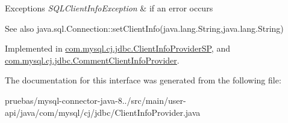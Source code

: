 \begin{DoxyExceptions}{Exceptions}
{\em S\+Q\+L\+Client\+Info\+Exception} & if an error occurs\\
\hline
\end{DoxyExceptions}
\begin{DoxySeeAlso}{See also}
java.\+sql.\+Connection\+::set\+Client\+Info(java.\+lang.\+String,java.\+lang.\+String) 
\end{DoxySeeAlso}


Implemented in \mbox{\hyperlink{classcom_1_1mysql_1_1cj_1_1jdbc_1_1_client_info_provider_s_p_a5f11c59093e5f448770a7f48fb17fcf2}{com.\+mysql.\+cj.\+jdbc.\+Client\+Info\+Provider\+SP}}, and \mbox{\hyperlink{classcom_1_1mysql_1_1cj_1_1jdbc_1_1_comment_client_info_provider_a76cfb73296a575e078acf7228e36b2dc}{com.\+mysql.\+cj.\+jdbc.\+Comment\+Client\+Info\+Provider}}.



The documentation for this interface was generated from the following file\+:\begin{DoxyCompactItemize}
\item 
pruebas/mysql-\/connector-\/java-\/8../src/main/user-\/api/java/com/mysql/cj/jdbc/Client\+Info\+Provider.\+java\end{DoxyCompactItemize}
